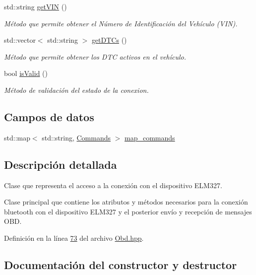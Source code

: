 \begin{DoxyCompactItemize}
std\+::string \hyperlink{classObd_ad88a0f25a7e3961726737915668ee13d}{get\+V\+IN} ()
\begin{DoxyCompactList}\small\item\em Método que permite obtener el Número de Identificación del Vehículo (V\+IN). \end{DoxyCompactList}\item 
std\+::vector$<$ std\+::string $>$ \hyperlink{classObd_ac57afb9228d933c6be5b2fa8e6446036}{get\+D\+T\+Cs} ()
\begin{DoxyCompactList}\small\item\em Método que permite obtener los D\+TC activos en el vehículo. \end{DoxyCompactList}\item 
bool \hyperlink{classObd_ae28b765bb787467f929eae932133d2aa}{is\+Valid} ()
\begin{DoxyCompactList}\small\item\em Método de validación del estado de la conexion. \end{DoxyCompactList}\end{DoxyCompactItemize}
\subsection*{Campos de datos}
\begin{DoxyCompactItemize}
\item 
std\+::map$<$ std\+::string, \hyperlink{classCommands}{Commands} $>$ \hyperlink{classObd_a8300062d1b651d049cf2a2bc916496cd}{map\+\_\+commands}
\end{DoxyCompactItemize}


\subsection{Descripción detallada}
Clase que representa el acceso a la conexión con el dispositivo E\+L\+M327. 

Clase principal que contiene los atributos y métodos necesarios para la conexión bluetooth con el dispositivo E\+L\+M327 y el posterior envío y recepción de mensajes O\+BD. 

Definición en la línea \hyperlink{Obd_8hpp_source_l00073}{73} del archivo \hyperlink{Obd_8hpp_source}{Obd.\+hpp}.



\subsection{Documentación del constructor y destructor}
\mbox{\label{classObd_abd8375cee2ad218a9ae8b464d7b1d63f}} 
